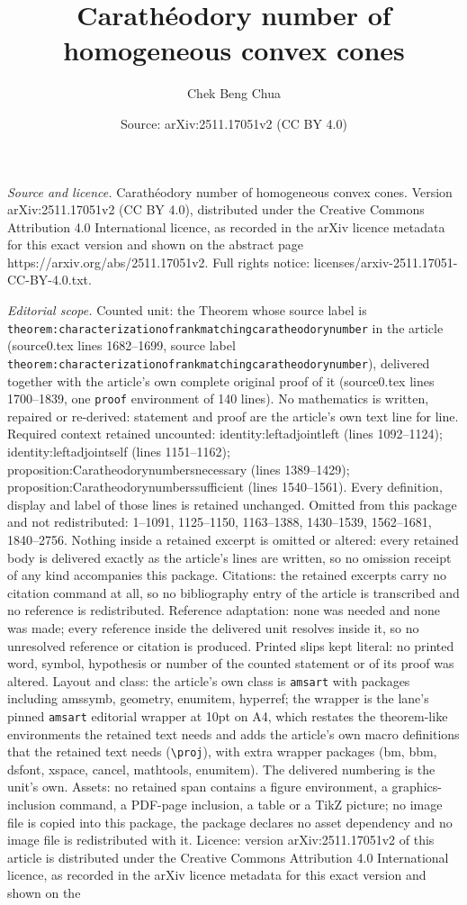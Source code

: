 \documentclass[10pt,a4paper]{amsart}
\title[Carath\'eodory number of homogeneous convex cones]{Carath\'eodory number of homogeneous convex cones}
\author{Chek Beng Chua}
\date{Source: arXiv:2511.17051v2 (CC BY 4.0)}
\begin{document}
\maketitle

\noindent\emph{Source and licence.} Carath\'eodory number of homogeneous convex cones. Version arXiv:2511.17051v2 (CC BY 4.0), distributed under the Creative Commons Attribution 4.0 International licence, as recorded in the arXiv licence metadata for this exact version and shown on the abstract page https://arxiv.org/abs/2511.17051v2. Full rights notice: licenses/arxiv-2511.17051-CC-BY-4.0.txt.\par\smallskip

\noindent\textit{Editorial scope.} Counted unit: the Theorem whose source label is \texttt{theorem:characterizationofrankmatchingcaratheodorynumber} in the article (source0.tex lines 1682--1699, source label \texttt{theorem:characterizationofrankmatchingcaratheodorynumber}), delivered together with the article's own complete original proof of it (source0.tex lines 1700--1839, one \texttt{proof} environment of 140 lines). No mathematics is written, repaired or re-derived: statement and proof are the article's own text line for line. Required context retained uncounted: identity:leftadjointleft (lines 1092--1124); identity:leftadjointself (lines 1151--1162); proposition:Caratheodorynumbersnecessary (lines 1389--1429); proposition:Caratheodorynumberssufficient (lines 1540--1561). Every definition, display and label of those lines is retained unchanged. Omitted from this package and not redistributed: 1--1091, 1125--1150, 1163--1388, 1430--1539, 1562--1681, 1840--2756. Nothing inside a retained excerpt is omitted or altered: every retained body is delivered exactly as the article's lines are written, so no omission receipt of any kind accompanies this package. Citations: the retained excerpts carry no citation command at all, so no bibliography entry of the article is transcribed and no reference is redistributed. Reference adaptation: none was needed and none was made; every reference inside the delivered unit resolves inside it, so no unresolved reference or citation is produced. Printed slips kept literal: no printed word, symbol, hypothesis or number of the counted statement or of its proof was altered. Layout and class: the article's own class is \texttt{amsart} with packages including amssymb, geometry, enumitem, hyperref; the wrapper is the lane's pinned \texttt{amsart} editorial wrapper at 10pt on A4, which restates the theorem-like environments the retained text needs and adds the article's own macro definitions that the retained text needs (\texttt{\textbackslash proj}), with extra wrapper packages (bm, bbm, dsfont, xspace, cancel, mathtools, enumitem). The delivered numbering is the unit's own. Assets: no retained span contains a figure environment, a graphics-inclusion command, a PDF-page inclusion, a table or a TikZ picture; no image file is copied into this package, the package declares no asset dependency and no image file is redistributed with it. Licence: version arXiv:2511.17051v2 of this article is distributed under the Creative Commons Attribution 4.0 International licence, as recorded in the arXiv licence metadata for this exact version and shown on the 
\end{document}
